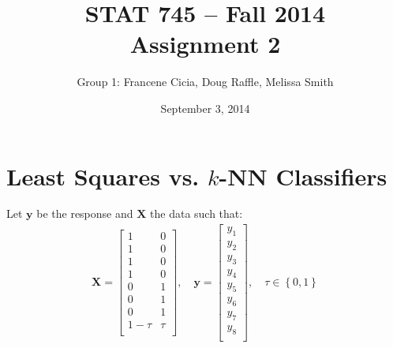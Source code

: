 \documentclass[a4paper]{article}
\title{\vspace{-30pt}STAT 745 -- Fall 2014\\Assignment 2}
\author{Group 1: Francene Cicia, Doug Raffle, Melissa Smith}
\date{September 3, 2014}
\begin{document}
\setlength{\parindent}{0pt}
\vspace{-50pt}
\maketitle

\section{Least Squares vs. $k$-NN Classifiers}
Let $\mathbf{y}$ be the response and $\mathbf{X}$ the data such that:
\begin{align*}
\mathbf{X}=
  \begin{bmatrix}
    1 & 0 \\
    1 & 0 \\
    1 & 0 \\
    1 & 0 \\
    0 & 1 \\
    0 & 1 \\
    0 & 1 \\
    1-\tau & \tau\\
  \end{bmatrix},
\quad \mathbf{y} = 
  \begin{bmatrix}
    y_1\\
    y_2\\
    y_3\\
    y_4\\
    y_5\\
    y_6\\
    y_7\\
    y_8\\
  \end{bmatrix},
\quad \tau \in \left\{0,1\right\}
\end{align*}
\end{document}
